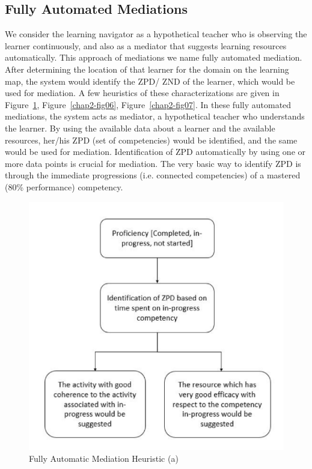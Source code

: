\begin{multicols}{2}
\subsection{Fully Automated Mediations}
We consider the learning navigator as a hypothetical teacher who is observing the learner continuously, and also as a mediator that suggests learning resources automatically. This approach of mediations we name fully automated mediation. After determining the location of that learner for the domain on the learning map, the system would identify the ZPD/ ZND of the learner, which would be used for mediation. A few heuristics of these characterizations are given in Figure~\ref{chap2-fig05}, Figure~\ref{chap2-fig06}, Figure~\ref{chap2-fig07}. In these fully automated mediations, the system acts as mediator, a hypothetical teacher who understands the learner. By using the available data about a learner and the available resources, her/his ZPD (set of competencies) would be identified, and the same would be used for mediation. Identification of ZPD automatically by using one or more data points is crucial for mediation. The very basic way to identify ZPD is through the immediate progressions (i.e. connected competencies) of a mastered (80\% performance) competency.
\begin{figure}[H]
\centering
\includegraphics[scale=.75]{src/Figures/chap2/chap2-fig05.jpg}
\caption{Fully Automatic Mediation Heuristic (a)}\label{chap2-fig05}
\end{figure}


\end{multicols}
